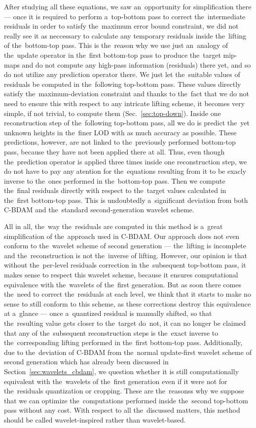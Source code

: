 After studying all these equations, we saw an~opportunity for simplification there --- once it is required to perform a~top-bottom pass to correct the~intermediate residuals in order to satisfy the~maximum error bound constraint, we did not really see it as neccessary to calculate any temporary residuals inside the~lifting of the~bottom-top pass. This is the~reason why we use just an~analogy of the~update operator in the~first bottom-top pass to produce the~target mip-maps and do not compute any high-pass information (residuals) there yet, and so do not utilize any prediction operator there. We just let the~suitable values of residuals be computed in the~following top-bottom pass. These values directly satisfy the~maximum-deviation constraint and thanks to the~fact that we do not need to ensure this with respect to any intricate lifting scheme, it becomes very simple, if not trivial, to compute them (Sec.~\ref{sec:top-down}). Inside one reconstruction step of the~following top-bottom pass, all we do is predict the~yet unknown heights in the~finer LOD with as much accuracy as possible. These predictions, however, are not linked to the~previously performed bottom-top pass, because they have not been applied there at all. Thus, even though the~prediction operator is applied three times inside one reconstruction step, we do not have to pay any atention for the~equations resulting from it to be exacly inverse to the~ones performed in the~bottom-top pass. Then we compute the~final residuals directly with respect to the~target values calculated in the~first bottom-top pass. This is undoubtedly a~significant deviation from both C-BDAM and the~standard second-generation wavelet scheme. 

All in all, the~way the~residuals are computed in this method is a~great simplification of the~approach used in C-BDAM. Our approach does not even conform to the~wavelet scheme of second generation --- the~lifting is incomplete and the~reconstruction is not the~inverse of lifting. However, our opinion is that without the~per-level residuals correction in the~subsequent top-bottom pass, it makes sense to respect this wavelet scheme, because it ensures computational equivalence with the~wavelets of the~first generation. But as soon there comes the~need to correct the~residuals at each level, we think that it starts to make no sense to still conform to this scheme, as these corrections destroy this equivalence at a~glance --- once a~quantized residual is manually shifted, so that the~resulting value gets closer to the~target do~not, it can no longer be claimed that any of the~subsequent reconstruction steps is the~exact inverse to the~corresponding lifting performed in the~first bottom-top pass. Additionally, due to the~deviation of C-BDAM from the~normal update-first wavelet scheme of second generation which has already been discussed in Section~\ref{sec:wavelets_cbdam}, we question whether it is still computationally equivalent with the~wavelets of the~first generation even if it were not for the~residuals quantization or cropping. These are the~reasonss why we suppose that we can optimize the~computations performed inside the~second top-bottom pass without any cost. With respect to all the~discussed matters, this method should be called wavelet-inspired rather than wavelet-based.